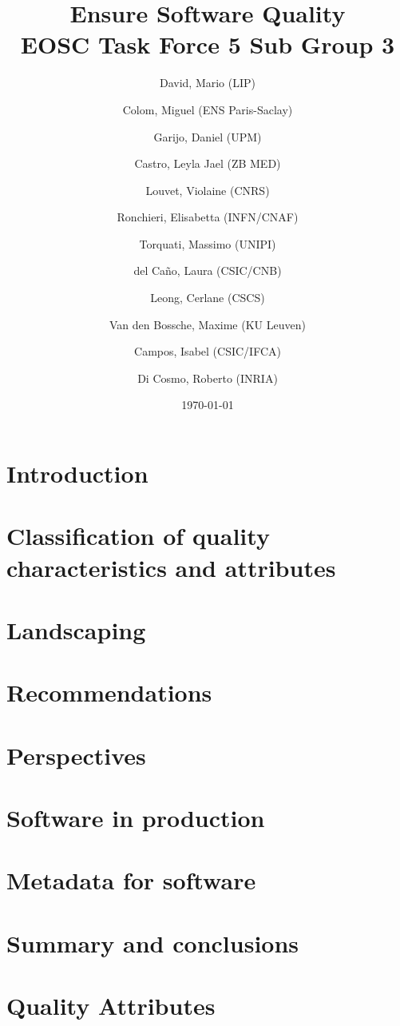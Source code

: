 \documentclass[a4paper]{article}
\title{Ensure Software Quality \\
    \large EOSC Task Force 5 Sub Group 3}
\author{
    David, Mario (LIP) \orcidlink{0000-0003-1802-5356} \and
    Colom, Miguel (ENS Paris-Saclay) \orcidlink{0000-0003-2636-0656} \and
    Garijo, Daniel (UPM) \orcidlink{0000-0003-0454-7145} \and
    Castro, Leyla Jael (ZB MED) \orcidlink{0000-0003-3986-0510} \and
    Louvet, Violaine (CNRS) \orcidlink{0000-0002-8742-8952} \and
    Ronchieri, Elisabetta (INFN/CNAF) \orcidlink{0000-0002-7341-6491} \and
    Torquati, Massimo (UNIPI) \orcidlink{0000-0001-6323-3459} \and
    del Ca\~{n}o, Laura (CSIC/CNB) \orcidlink{0000-0003-0981-2040} \and
    Leong, Cerlane (CSCS)  \orcidlink{0000-0001-8241-6277} \and
    Van den Bossche, Maxime (KU Leuven) \orcidlink{0000-0002-0938-0156} \and
    Campos, Isabel (CSIC/IFCA) \orcidlink{0000-0002-9350-0383} \and
    Di Cosmo, Roberto (INRIA) \orcidlink{0000-0002-7493-5349}
}
\date{\today}
\begin{document}
\maketitle

\tableofcontents

\newpage
\section{Introduction}
\label{sec:introduction}

\newpage

\section{Classification of quality characteristics and attributes}
\label{sec:classification}

\newpage

\section{Landscaping}
\label{sec:landscaping}

\newpage

\section{Recommendations}
\label{sec:recommendations}

\newpage

\section{Perspectives}
\label{sec:perspectives}

\newpage

\section{Software in production}
\label{sec:sw_in_prod}

\newpage

\section{Metadata for software}
\label{sec:metadata}

\newpage

\section{Summary and conclusions}
\label{sec:summary}

\newpage

\appendix
\section{Quality Attributes}
\label{appendix_qa}


\newpage
\printbibliography
\end{document}
